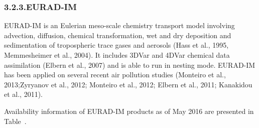\documentclass[9pt]{report}
\begin{document}
\subsubsection{3.2.3.\hspace*{0.5em}EURAD-IM}\label{sec-eurad-im}%

\noindent{}EURAD-IM is an Eulerian meso-scale chemistry transport model involving advection, diffusion, chemical transformation, wet and dry deposition and sedimentation of tropospheric trace gases and aerosols (Hass et al., 1995, Memmesheimer et al., 2004). It includes 3DVar and 4DVar chemical data assimilation (Elbern et al., 2007) and is able to run in nesting mode.
EURAD-IM has been applied on several recent air pollution studies (Monteiro et al., 2013;Zyryanov et al., 2012; Monteiro et al., 2012; Elbern et al., 2011; Kanakidou et al., 2011).%

Availability information of EURAD-IM products as of May 2016 are presented in Table~.%
\end{document}
